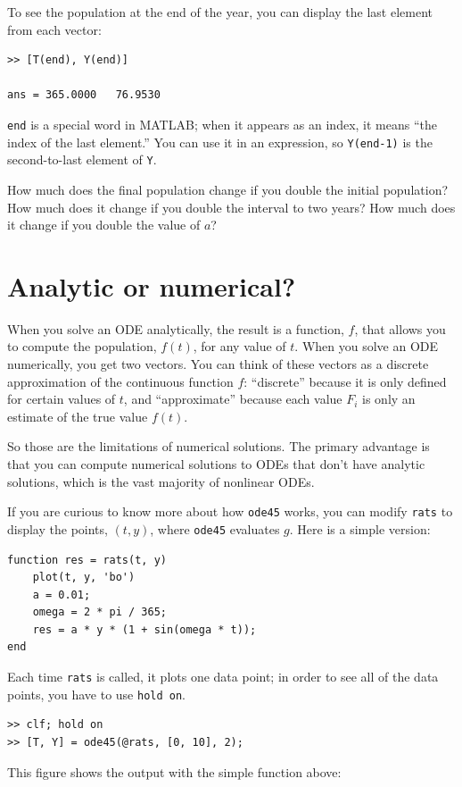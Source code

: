 \documentclass[
]{book}
\begin{document}
To see the population at the end of the year, you can display the
last element from each vector:

\begin{verbatim}
>> [T(end), Y(end)]

ans = 365.0000   76.9530
\end{verbatim}

{\tt end} is a special word in MATLAB; when it appears as an index,
it means ``the index of the last element.''  You can use it in an
expression, so {\tt Y(end-1)} is the second-to-last element of
{\tt Y}.

How much does the final population change if you double the initial
population?  How much does it change if you double the interval
to two years?  How much does it change if you double the value
of $a$?


\section{Analytic or numerical?}

When you solve an ODE analytically, the result is a function, $f$,
that allows you to compute the population, $f(t)$, for any value of
$t$.  When you solve an ODE numerically, you get two vectors.  You can
think of these vectors as a discrete approximation of the continuous
function $f$: ``discrete'' because it is only defined for certain
values of $t$, and ``approximate'' because each value $F_i$
is only an estimate of the true value $f(t)$.

So those are the limitations of numerical solutions.  The primary
advantage is that you can compute numerical solutions to ODEs that
don't have analytic solutions, which is the vast majority
of nonlinear ODEs.

If you are curious to know more about how {\tt ode45} works, you
can modify {\tt rats} to display the points, $(t, y)$, where
{\tt ode45} evaluates $g$.  Here is a simple version:

\begin{verbatim}
function res = rats(t, y)
    plot(t, y, 'bo')
    a = 0.01;
    omega = 2 * pi / 365;
    res = a * y * (1 + sin(omega * t));
end
\end{verbatim}

Each time {\tt rats} is called, it plots one data point; in order
to see all of the data points, you have to use {\tt hold on}.

\begin{verbatim}
>> clf; hold on
>> [T, Y] = ode45(@rats, [0, 10], 2);
\end{verbatim}
This figure shows the output with the simple function above:
\end{document}
